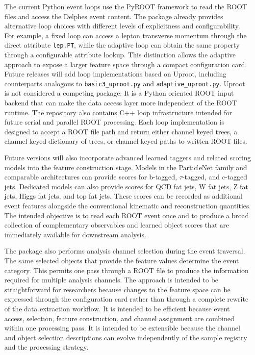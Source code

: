 \documentclass[11pt,a4paper]{article}
\begin{document}
The current Python event loops use the PyROOT framework to read the ROOT files
and access the Delphes event content. The package already provides
alternative loop choices with different levels of explicitness and
configurability. For example, a fixed loop can access a lepton transverse
momentum through the direct attribute \texttt{lep.PT}, while the adaptive loop
can obtain the same property through a configurable attribute lookup. This
distinction allows the adaptive approach to expose a larger feature space
through a compact configuration card. Future releases will add loop
implementations based on Uproot, including counterparts analogous to
\texttt{basic3\_uproot.py} and \texttt{adaptive\_uproot.py}. Uproot is not
considered a competing package. It is a Python oriented ROOT input backend that
can make the data access layer more independent of the ROOT runtime. The
repository also contains C++ loop infrastructure intended for future serial and
parallel ROOT processing. Each loop implementation is designed to accept a ROOT
file path and return either channel keyed trees, a channel keyed dictionary of
trees, or channel keyed paths to written ROOT files.

Future versions will also incorporate advanced learned taggers and related
scoring models into the feature construction stage. Models in the ParticleNet
family and comparable architectures can provide scores for b-tagged,
$\tau$-tagged, and c-tagged jets. Dedicated models can also provide scores for QCD fat
jets, W fat jets, Z fat jets, Higgs fat jets, and top fat jets. These scores can
be recorded as additional event features alongside the conventional kinematic
and reconstruction quantities. The intended objective is to read each ROOT event
once and to produce a broad collection of complementary observables and learned
object scores that are immediately available for downstream analysis.

The package also performs analysis channel selection during the event traversal.
The same selected objects that provide the feature values determine the event
category. This permits one pass through a ROOT file to produce the information
required for multiple analysis channels. The approach is intended to be
straightforward for researchers because changes to the feature space can be
expressed through the configuration card rather than through a complete rewrite
of the data extraction workflow. It is intended to be efficient because event
access, selection, feature construction, and channel assignment are combined
within one processing pass. It is intended to be extensible because the channel
and object selection descriptions can evolve independently of the sample
registry and the processing strategy.
\end{document}
